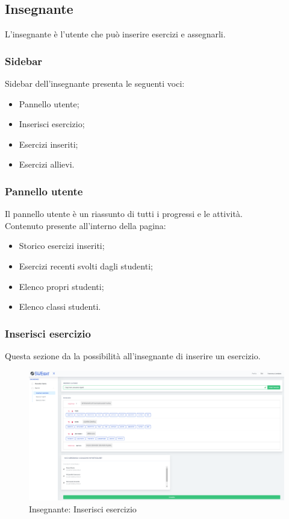 \newpage
    \subsection{Insegnante}
      L'insegnante è l'utente che può inserire esercizi e assegnarli.
        \subsubsection{Sidebar}
          Sidebar dell'insegnante presenta le seguenti voci:
        	\begin{itemize}
            	\item Pannello utente;
            	\item Inserisci esercizio;
            	\item Esercizi inseriti;
            	\item Esercizi allievi.
        	\end{itemize}
        
        
        
        \subsubsection{Pannello utente}
          Il pannello utente è un riassunto di tutti i progressi e le attività.
         \\Contenuto presente all'interno della pagina:
        	\begin{itemize}
        	\item Storico esercizi inseriti; 
        	\item Esercizi recenti svolti dagli studenti;
        	\item Elenco propri studenti;
        	\item Elenco classi studenti.
        	\end{itemize}
        
        
        
        
        \subsubsection{Inserisci esercizio}
          Questa sezione da la possibilità all'insegnante di inserire un esercizio.
        	\begin{figure}[H]
            \centering
        	\includegraphics[width=17cm]{sez/img/insegnante/inserisciEsercizio.PNG} 
            \caption{Insegnante: Inserisci esercizio}\label{fig:1}
        	\end{figure}
        
